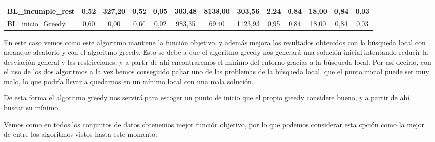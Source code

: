 \documentclass[12pt, spanish]{article}
\begin{document}
\begin{table}[H]
\begin{adjustwidth}{-1.9cm}{-1.9cm}
\begin{tabular}{|l|c|c|c|c|c|c|c|c|c|c|c|c|}
BL\_incumple\_rest                                      & 0,52                         & 327,20                         & 0,52                      & 0,05                   & 303,48                       & 8138,00                        & 303,56                    & 2,24                   & 0,84                         & 18,00                          & 0,84                      & 0,03                   \\ \hline
BL\_inicio\_Greedy                                      & 0,60                         & 0,00                           & 0,60                      & 0,02                   & 983,35                       & 69,40                          & 1123,93                   & 0,95                   & 0,84                         & 18,00                          & 0,84                      & 0,03                   \\ \hline
\end{tabular}

\end{adjustwidth}
\end{table}

En este caso vemos como este algoritmo mantiene la función objetivo, y además mejora los resultados obtenidos con la búsqueda local con arranque aleatorio y con el algoritmo greedy. Esto se debe a que el algoritmo greedy nos generará una solución inicial intentando reducir la desviación general y las restricciones, y a partir de ahí encontraremos el mínimo del entorno gracias a la búsqueda local. Por así decirlo, con el uso de los dos algoritmos a la vez hemos conseguido paliar uno de los problemas de la búsqueda local, que el punto inicial puede ser muy malo, lo que podría llevar a quedarnos en un mínimo local con una mala solución.

De esta forma el algoritmo greedy nos servirá para escoger un punto de inicio que el propio greedy considere bueno, y a partir de ahí buscar su mínimo.

Vemos como en todos los conjuntos de datos obtenemos mejor función objetivo, por lo que podemos considerar esta opción como la mejor  de entre los algoritmos vistos hasta este momento.
\end{document}
